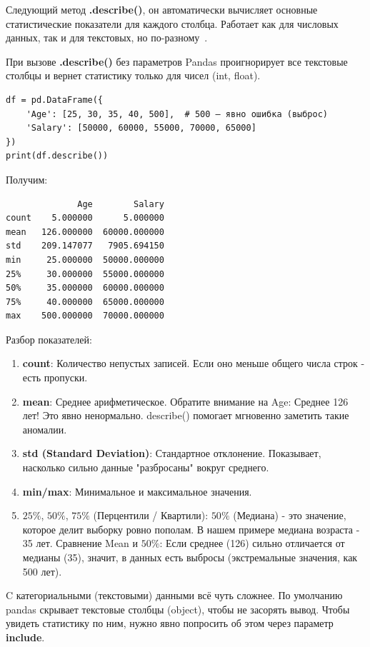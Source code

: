 \documentclass[pract]{SCWorks}
\begin{document}
Следующий метод \textbf{.describe()}, он автоматически вычисляет основные статистические показатели для каждого столбца.
Работает как для числовых данных, так и для текстовых, но по-разному~\cite{pandas-docs}.

При вызове \textbf{.describe()} без параметров Pandas проигнорирует все текстовые столбцы и вернет статистику только для чисел (int, float).

\begin{verbatim}
df = pd.DataFrame({
    'Age': [25, 30, 35, 40, 500],  # 500 — явно ошибка (выброс)
    'Salary': [50000, 60000, 55000, 70000, 65000]
})
print(df.describe())
\end{verbatim}

Получим:

\begin{verbatim}
              Age        Salary
count    5.000000      5.000000
mean   126.000000  60000.000000
std    209.147077   7905.694150
min     25.000000  50000.000000
25%     30.000000  55000.000000
50%     35.000000  60000.000000
75%     40.000000  65000.000000
max    500.000000  70000.000000
\end{verbatim}

Разбор показателей:

\begin{enumerate}
    \item \textbf{count}: Количество непустых записей. Если оно меньше общего числа строк - есть пропуски.
    \item \textbf{mean}: Среднее арифметическое. Обратите внимание на Age: Среднее 126 лет! 
    Это явно ненормально. describe() помогает мгновенно заметить такие аномалии.
    \item \textbf{std (Standard Deviation)}: Стандартное отклонение. Показывает, насколько сильно данные "разбросаны" вокруг среднего.
    \item \textbf{min/max}: Минимальное и максимальное значения.
    \item $25\%$, $50\%$, $75\%$ (Перцентили / Квартили): 
    $50\%$ (Медиана) - это значение, которое делит выборку ровно пополам. В нашем примере медиана возраста - 35 лет.
    Сравнение Mean и $50\%$: Если среднее (126) сильно отличается от медианы (35), значит, в данных есть выбросы (экстремальные значения, как 500 лет).
\end{enumerate}

C категориальными (текстовыми) данными всё чуть сложнее. По умолчанию pandas скрывает текстовые столбцы (object), 
чтобы не засорять вывод. Чтобы увидеть статистику по ним, нужно явно попросить об этом через параметр \textbf{include}.
\end{document}
